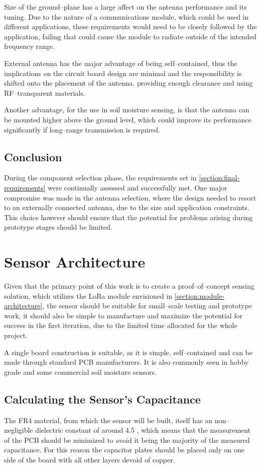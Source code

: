 Size of the ground--plane has a large affect on the antenna performance and its tuning. Due to the nature of a communications module, which could be used in different applications, these requirements would need to be closely followed by the application, failing that could cause the module to radiate outside of the intended frequency range.

External antenna has the major advantage of being self--contained, thus the implications on the circuit board design are minimal and the responsibility is shifted onto the placement of the antenna, providing enough clearance and using RF--transparent materials.

Another advantage, for the use in soil moisture sensing, is that the antenna can be mounted higher above the ground level, which could improve its performance significantly if long--range transmission is required.

\subsection{Conclusion}
During the component selection phase, the requirements set in \ref{section:final-requirements} were continually assessed and successfully met. One major compromise was made in the antenna selection, where the design needed to resort to an externally connected antenna, due to the size and application constraints. This choice however should ensure that the potential for problems arising during prototype stages should be limited.

\FloatBarrier
\section{Sensor Architecture}
Given that the primary point of this work is to create a proof--of--concept sensing solution, which utilizes the LoRa module envisioned in \ref{section:module-architecture}, the sensor should be suitable for small--scale testing and prototype work, it should also be simple to manufacture and maximize the potential for success in the first iteration, due to the limited time allocated for the whole project.

A single board construction is suitable, as it is simple, self--contained and can be made through standard PCB manufacturers. It is also commonly seen in hobby grade and some commercial soil moisture sensors.

\subsection{\label{section:expected-cap}Calculating the Sensor's Capacitance}
The FR4 material, from which the sensor will be built, itself has an non--negligible dielectric constant of around 4.5 \cite{pcbway_stackup_2024}, which means that the measurement of the PCB should be minimized to avoid it being the majority of the measured capacitance. For this reason the capacitor plates should be placed only on one side of the board with all other layers devoid of copper.

